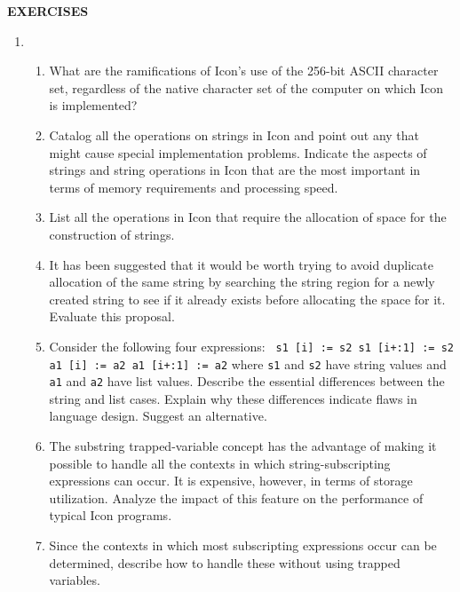 {\sffamily\bfseries
EXERCISES}

\liststyleLv
\begin{enumerate}
\item \begin{enumerate}

\item What are the ramifications of Icon's use of the 256-bit ASCII
character set, regardless of the {\textquotedbl}native{\textquotedbl}
character set of the computer on which Icon is implemented?

\item Catalog all the operations on strings in Icon and point out any
that might cause special implementation problems.  Indicate the
aspects of strings and string operations in Icon that are the most
important in terms of memory requirements and processing speed.

\item List all the operations in Icon that require the allocation of
space for the construction of strings.

\item It has been suggested that it would be worth trying to avoid
duplicate allocation of the same string by searching the string region
for a newly created string to see if it already exists before
allocating the space for it. Evaluate this proposal.

\item 
Consider the following four expressions:\newline
\texttt{ s1 [i] := s2\newline
 s1 [i+:1] := s2\newline
 a1 [i] := a2\newline
 a1 [i+:1] := a2}\newline
where \texttt{s1} and \texttt{s2} have string values and \texttt{a1}
and \texttt{a2} have list values. Describe the essential differences
between the string and list cases. Explain why these differences
indicate flaws in language design. Suggest an alternative.

\item The substring trapped-variable concept has the advantage of
making it possible to handle all the contexts in which
string-subscripting expressions can occur. It is expensive, however,
in terms of storage utilization. Analyze the impact of this feature on
the performance of {\textquotedbl}typical{\textquotedbl} Icon
programs.

\item Since the contexts in which most subscripting expressions occur
can be determined, describe how to handle these without using trapped
variables.


\end{enumerate}
\end{enumerate}
